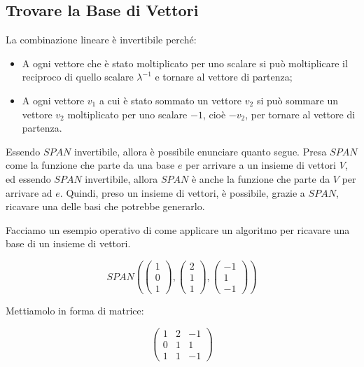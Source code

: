 \documentclass{article}
\begin{document}
\subsection{Trovare la Base di Vettori}

La combinazione lineare è invertibile perché:
\begin{itemize}
    \item A ogni vettore che è stato moltiplicato per uno scalare \lambda si può moltiplicare il reciproco di quello scalare $\lambda ^{-1}$ e tornare al vettore di partenza;
    \item A ogni vettore $v_1$ a cui è stato sommato un vettore $v_2$ si può sommare un vettore $v_2$ moltiplicato per uno scalare $-1$, cioè $-v_2$, per tornare al vettore di partenza.
\end{itemize}

Essendo \hyperref[def:funzione_span]{$SPAN$} invertibile, allora è possibile enunciare quanto segue. Presa \hyperref[def:funzione_span]{$SPAN$} come la funzione che parte da una base $e$ per arrivare a un insieme di vettori $V$, ed essendo \hyperref[def:funzione_span]{$SPAN$} invertibile, allora \hyperref[def:funzione_span]{$SPAN$} è anche la funzione che parte da $V$ per arrivare ad $e$. Quindi, preso un insieme di vettori, è possibile, grazie a \hyperref[def:funzione_span]{$SPAN$}, ricavare una delle basi che potrebbe generarlo.

Facciamo un esempio operativo di come applicare un algoritmo per ricavare una base di un insieme di vettori.

\[SPAN(\begin{pmatrix}
    1 \\
    0 \\
    1
\end{pmatrix}, \begin{pmatrix}
    2 \\
    1 \\
    1
\end{pmatrix}, \begin{pmatrix}
    -1 \\
    1 \\
    -1
\end{pmatrix})\]

Mettiamolo in forma di matrice:

\[\begin{pmatrix}
1 & 2 & -1 \\
0 & 1 & 1 \\
1 & 1 & -1
\end{pmatrix}\]
\end{document}
